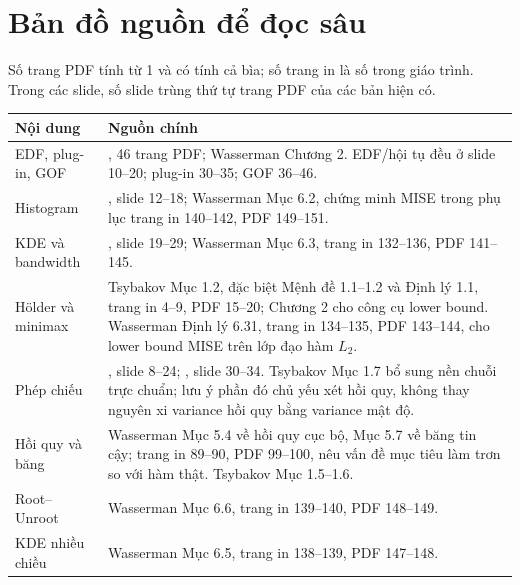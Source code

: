 \section{Bản đồ nguồn để đọc sâu}
Số trang PDF tính từ 1 và có tính cả bìa; số trang in là số trong giáo
trình. Trong các slide, số slide trùng thứ tự trang PDF của các bản hiện có.
\begin{longtable}{p{}p{}}
\toprule Nội dung & Nguồn chính\\\midrule\endhead
EDF, plug-in, GOF & \cite{slide1}, 46 trang PDF; Wasserman Chương 2.
EDF/hội tụ đều ở slide 10--20; plug-in 30--35; GOF 36--46.\\[4pt]
Histogram & \cite{slide2}, slide 12--18; Wasserman Mục 6.2,
chứng minh MISE trong phụ lục trang in 140--142, PDF 149--151.\\[4pt]
KDE và bandwidth & \cite{slide2}, slide 19--29; Wasserman Mục 6.3,
trang in 132--136, PDF 141--145.\\[4pt]
Hölder và minimax & Tsybakov Mục 1.2, đặc biệt Mệnh đề 1.1--1.2
và Định lý 1.1, trang in 4--9, PDF 15--20;
Chương 2 cho công cụ lower bound.
Wasserman Định lý 6.31, trang in 134--135, PDF 143--144,
cho lower bound MISE trên lớp đạo hàm $L_2$.\\[4pt]
Phép chiếu & \cite{projection}, slide 8--24; \cite{slide2}, slide 30--34.
Tsybakov Mục 1.7 bổ sung nền chuỗi trực chuẩn; lưu ý phần đó chủ yếu
xét hồi quy, không thay nguyên xi variance hồi quy bằng variance mật độ.\\[4pt]
Hồi quy và băng & Wasserman Mục 5.4 về hồi quy cục bộ, Mục 5.7
về băng tin cậy; trang in 89--90, PDF 99--100, nêu vấn đề mục tiêu
làm trơn so với hàm thật. Tsybakov Mục 1.5--1.6.\\[4pt]
Root--Unroot & Wasserman Mục 6.6, trang in 139--140, PDF 148--149.\\[4pt]
KDE nhiều chiều & Wasserman Mục 6.5, trang in 138--139, PDF 147--148.\\
\bottomrule
\end{longtable}

